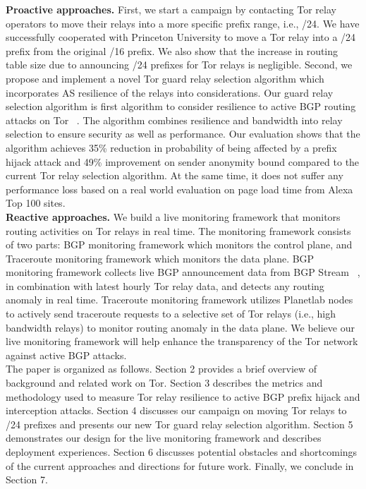 \textbf{Proactive approaches.} First, we start a campaign by contacting Tor relay operators to move their relays into a more specific prefix range, i.e., /24. We have successfully cooperated with Princeton University to move a Tor relay into a /24 prefix from the original /16 prefix. We also show that the increase in routing table size due to announcing /24 prefixes for Tor relays is negligible. Second, we propose and implement a novel Tor guard relay selection algorithm which incorporates AS resilience of the relays into considerations. Our guard relay selection algorithm is first algorithm to consider resilience to active BGP routing attacks on Tor ~\cite{sun2015raptor}. The algorithm combines resilience and bandwidth into relay selection to ensure security as well as performance. Our evaluation shows that the algorithm achieves 35\% reduction in probability of being affected by a prefix hijack attack and 49\% improvement on sender anonymity bound compared to the current Tor relay selection algorithm. At the same time, it does not suffer any performance loss based on a real world evaluation on page load time from Alexa Top 100 sites. 
\\
\textbf{Reactive approaches.} We build a live monitoring framework that monitors routing activities on Tor relays in real time. The monitoring framework consists of two parts: BGP monitoring framework which monitors the control plane, and Traceroute monitoring framework which monitors the data plane. BGP monitoring framework collects live BGP announcement data from BGP Stream ~\cite{bgpstream}, in combination with latest hourly Tor relay data, and detects any routing anomaly in real time. Traceroute monitoring framework utilizes Planetlab nodes to actively send traceroute requests to a selective set of Tor relays (i.e., high bandwidth relays) to monitor routing anomaly in the data plane. We believe our live monitoring framework will help enhance the transparency of the Tor network against active BGP attacks.
\\
The paper is organized as follows. Section 2 provides a brief overview of background and related work on Tor.  Section 3 describes the metrics and methodology used to measure Tor relay resilience to active BGP prefix hijack and interception attacks. Section 4 discusses our campaign on moving Tor relays to /24 prefixes and presents our new Tor guard relay selection algorithm. Section 5 demonstrates our design for the live monitoring framework and describes deployment experiences. Section 6 discusses potential obstacles and shortcomings of the current approaches and directions for future work. Finally, we conclude in Section 7. 
